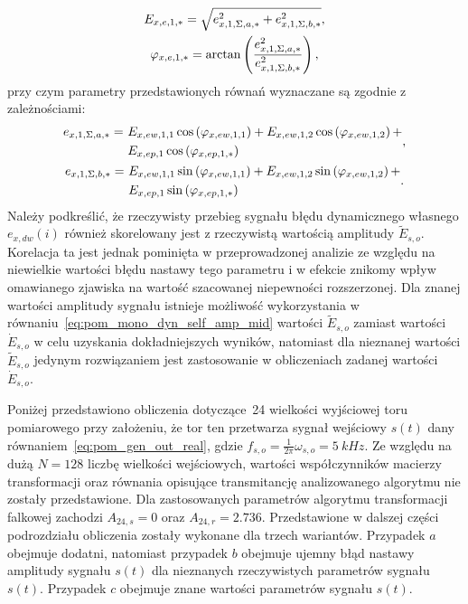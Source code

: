 \begin{gather}
E_{x,e,1,*} = \sqrt{e_{x,1,\Sigma,a,*}^{2} + e_{x,1,\Sigma,b,*}^{2}} \label{eq:pom_mono_dyn_sum_param_amp_mid}, \\
\varphi_{x,e,1,*} = \arctan \left(\frac{e_{x,1,\Sigma,a,*}^{2}}{e_{x,1,\Sigma,b,*}^{2}}\right) \label{eq:pom_mono_dyn_sum_param_phi_mid},
\end{gather}
przy czym parametry przedstawionych równań wyznaczane są zgodnie z zależnościami:
\begin{gather}
\begin{split}
e_{x,1,\Sigma,a,*} =~ & E_{x,ew,1,1} \cos \left(\varphi_{x,ew,1,1}\right) + E_{x,ew,1,2} \cos \left(\varphi_{x,ew,1,2}\right) + \\ & E_{x,ep,1} \cos \left(\varphi_{x,ep,1,*}\right)
\end{split}
\label{eq:pom_mono_dyn_sum_param_a_mid}, \\
\begin{split}
e_{x,1,\Sigma,b,*} =~ & E_{x,ew,1,1} \sin \left(\varphi_{x,ew,1,1}\right) + E_{x,ew,1,2} \sin \left(\varphi_{x,ew,1,2}\right) + \\ & E_{x,ep,1} \sin \left(\varphi_{x,ep,1,*}\right)
\end{split}
\label{eq:pom_mono_dyn_sum_param_b_mid}.
\end{gather}
Należy podkreślić, że rzeczywisty przebieg sygnału błędu dynamicznego własnego $e_{x,dw}(i)$ również skorelowany jest z rzeczywistą wartością amplitudy $\tilde{E}_{s,o}$. Korelacja ta jest jednak pominięta w przeprowadzonej analizie ze względu na niewielkie wartości błędu nastawy tego parametru i w efekcie znikomy wpływ omawianego zjawiska na wartość szacowanej niepewności rozszerzonej. Dla znanej wartości amplitudy sygnału istnieje możliwość wykorzystania w równaniu~\eqref{eq:pom_mono_dyn_self_amp_mid} wartości $\tilde{E}_{s,o}$ zamiast wartości $\dot{E}_{s,o}$ w celu uzyskania dokładniejszych wyników, natomiast dla nieznanej wartości $\tilde{E}_{s,o}$ jedynym rozwiązaniem jest zastosowanie w obliczeniach zadanej wartości $\dot{E}_{s,o}$.

Poniżej przedstawiono obliczenia dotyczące~\qty{24}{\numTej} wielkości wyjściowej toru pomiarowego przy założeniu, że tor ten przetwarza sygnał wejściowy $s(t)$ dany równaniem~\eqref{eq:pom_gen_out_real}, gdzie $f_{s,o} = \frac{1}{2\pi} \omega_{s,o} = \qty{5}{kHz}$. Ze względu na dużą $N = 128$ liczbę wielkości wejściowych, wartości współczynników macierzy transformacji oraz równania opisujące transmitancję analizowanego algorytmu nie zostały przedstawione. Dla zastosowanych parametrów algorytmu transformacji falkowej zachodzi $A_{24,s} = 0$ oraz $A_{24,r} = \num{2.736}$. Przedstawione w dalszej części podrozdziału obliczenia zostały wykonane dla trzech wariantów. Przypadek $a$ obejmuje dodatni, natomiast przypadek $b$ obejmuje ujemny błąd nastawy amplitudy sygnału $s(t)$ dla nieznanych rzeczywistych parametrów sygnału $s(t)$. Przypadek $c$ obejmuje znane wartości parametrów sygnału $s(t)$.

